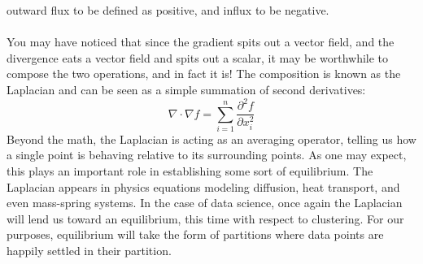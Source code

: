 outward flux to be defined as positive, and influx to be negative. 
\\\\
You may have noticed that since the gradient spits out a vector field,
and the divergence eats a vector field and spits out a scalar, it may
be worthwhile to compose the two operations, and in fact it is! The
composition is known as the Laplacian and can be seen as a simple
summation of second derivatives: 
\[
\nabla \cdot \nabla f = \sum_{i=1}^n \frac{\partial^2 f}{\partial x_i^2}
\]
Beyond the math, the Laplacian is acting as an averaging operator,
telling us how a single point is behaving relative to its surrounding
points. As one may expect, this plays an important role in
establishing some sort of equilibrium. The Laplacian appears in
physics equations modeling diffusion, heat transport, and even
mass-spring systems. In the case of data science, once again the
Laplacian will lend us toward an equilibrium, this time with respect
to clustering. For our purposes, equilibrium will take the form of
partitions where data points are happily settled in their partition. 

